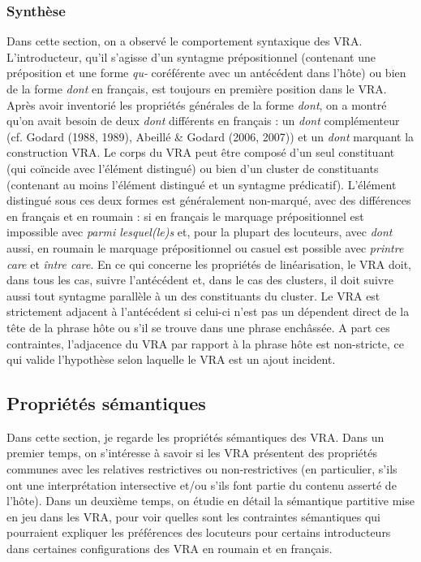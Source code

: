 \subsubsection{Synthèse}
Dans cette section, on a observé le comportement syntaxique des VRA. L'introducteur, qu'il s'agisse d'un syntagme prépositionnel (contenant une préposition et une forme \textit{qu-} coréférente avec un antécédent dans l'hôte) ou bien de la forme \textit{dont} en français, est toujours en première position dans le VRA. Après avoir inventorié les propriétés générales de la forme \textit{dont}, on a montré qu'on avait besoin de deux \textit{dont} différents en français : un \textit{dont} complémenteur (cf. Godard (1988, 1989), Abeillé \& Godard (2006, 2007)) et un \textit{dont} marquant la construction VRA. Le corps du VRA peut être composé d'un seul constituant (qui coïncide avec l'élément distingué) ou bien d'un cluster de constituants (contenant au moins l'élément distingué et un syntagme prédicatif). L'élément distingué sous ces deux formes est généralement non-marqué, avec des différences en français et en roumain : si en français le marquage prépositionnel est impossible avec \textit{parmi lesquel(le)s} et, pour la plupart des locuteurs, avec \textit{dont} aussi, en roumain le marquage prépositionnel ou casuel est possible avec \textit{printre care} et \textit{între care}. En ce qui concerne les propriétés de linéarisation, le VRA doit, dans tous les cas, suivre l'antécédent et, dans le cas des clusters, il doit suivre aussi tout syntagme parallèle à un des constituants du cluster. Le VRA est strictement adjacent à l'antécédent si celui-ci n'est pas un dépendent direct de la tête de la phrase hôte ou s'il se trouve dans une phrase enchâssée. A part ces contraintes, l'adjacence du VRA par rapport à la phrase hôte est non-stricte, ce qui valide l'hypothèse selon laquelle le VRA est un ajout incident.

\subsection{Propriétés sémantiques}
Dans cette section, je regarde les propriétés sémantiques des VRA. Dans un premier temps, on s'intéresse à savoir si les VRA présentent des propriétés communes avec les relatives restrictives ou non-restrictives (en particulier, s'ils ont une interprétation intersective et/ou s'ils font partie du contenu asserté de l'hôte). Dans un deuxième temps, on étudie en détail la sémantique partitive mise en jeu dans les VRA, pour voir quelles sont les contraintes sémantiques qui pourraient expliquer les préférences des locuteurs pour certains introducteurs dans certaines configurations des VRA en roumain et en français. 


